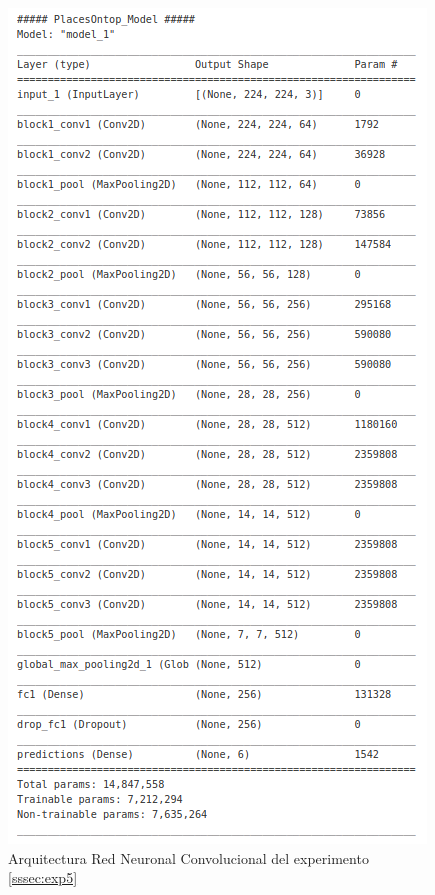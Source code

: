 \begin{figure}[!htb]
	\centering
	\includegraphics[width=0.7\linewidth]{images/architecture_exp4_6_cnn}
	\caption{Arquitectura Red Neuronal Convolucional del  experimento \ref{sssec:exp5}}
	\label{fig:architectureexp5}
\end{figure}